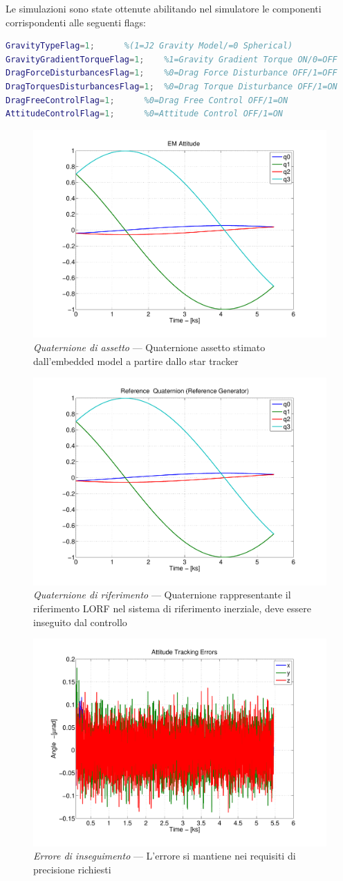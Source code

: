 Le simulazioni sono state ottenute abilitando nel simulatore le componenti
corrispondenti alle seguenti flags:
\begin{lstlisting}[language=matlab,breaklines=true]
GravityTypeFlag=1;		%(1=J2 Gravity Model/=0 Spherical)
GravityGradientTorqueFlag=1;	%1=Gravity Gradient Torque ON/0=OFF 
DragForceDisturbancesFlag=1;	%0=Drag Force Disturbance OFF/1=OFF
DragTorquesDisturbancesFlag=1;	%0=Drag Torque Disturbance OFF/1=ON
DragFreeControlFlag=1;		%0=Drag Free Control OFF/1=ON
AttitudeControlFlag=1;		%0=Attitude Control OFF/1=ON
\end{lstlisting}

\begin{figure}
	\includegraphics[width=.6\textwidth]{control/attitude_control/images/EmbeddedModelAttitude.pdf}
	\caption{\emph{Quaternione di assetto} --- Quaternione assetto stimato
	dall'embedded model a partire dallo star tracker}
	\label{fig:drag-acceleration}
\end{figure}

\begin{figure}
	\includegraphics[width=.6\textwidth]{control/attitude_control/images/ReferenceQuaternion.pdf}
	\caption{\emph{Quaternione di riferimento} --- Quaternione rappresentante il
	riferimento LORF nel sistema di riferimento inerziale, deve essere inseguito
	dal controllo}
	\label{fig:drag-acceleration}
\end{figure}

\begin{figure}
	\includegraphics[width=.6\textwidth]{control/attitude_control/images/TrackingError.pdf}
	\caption{\emph{Errore di inseguimento} --- L'errore si mantiene nei requisiti
	di precisione richiesti}
	\label{fig:drag-acceleration}
\end{figure}